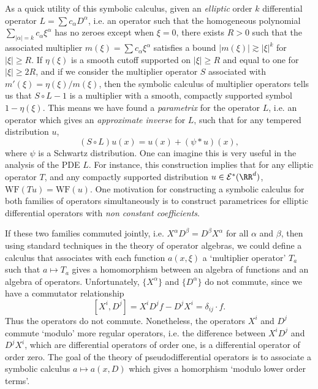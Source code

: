 As a quick utility of this symbolic calculus, given an \emph{elliptic} order $k$ differential operator $L = \sum c_\alpha D^\alpha$, i.e. an operator such that the homogeneous polynomial $\sum_{|\alpha| = k} c_\alpha \xi^\alpha$ has no zeroes except when $\xi = 0$, there exists $R > 0$ such that the associated multiplier $m(\xi) = \sum c_\alpha \xi^\alpha$ satisfies a bound $|m(\xi)| \gtrsim |\xi|^k$ for $|\xi| \geq R$. If $\eta(\xi)$ is a smooth cutoff supported on $|\xi| \geq R$ and equal to one for $|\xi| \geq 2R$, and if we consider the multiplier operator $S$ associated with $m'(\xi) = \eta(\xi) / m(\xi)$, then the symbolic calculus of multiplier operators tells us that $S \circ L - 1$ is a multiplier with a smooth, compactly supported symbol $1 - \eta(\xi)$. This means we have found a \emph{parametrix} for the operator $L$, i.e. an operator which gives an \emph{approximate inverse} for $L$, such that for any tempered distribution $u$,
%
\[ (S \circ L) u(x) = u(x) + (\psi * u)(x), \]
%
where $\psi$ is a Schwartz distribution. One can imagine this is very useful in the analysis of the PDE $L$. For instance, this construction implies that for any elliptic operator $T$, and any compactly supported distribution $u \in \mathcal{E}^*(\RR^d)$, $\text{WF}(Tu) = \text{WF}(u)$. One motivation for constructing a symbolic calculus for both families of operators simultaneously is to construct parametrices for elliptic differential operators with \emph{non constant coefficients}.

 If these two families commuted jointly, i.e. $X^\alpha D^\beta = D^\beta X^\alpha$ for all $\alpha$ and $\beta$, then using standard techniques in the theory of operator algebras, we could define a calculus that associates with each function $a(x,\xi)$ a `multiplier operator' $T_a$ such that $a \mapsto T_a$ gives a homomorphism between an algebra of functions and an algebra of operators. Unfortunately, $\{ X^\alpha \}$ and $\{ D^\alpha \}$ do not commute, since we have a commutator relationship
%
\[ [X^i, D^j] = X^i D^j f - D^j X^i = \delta_{ij} \cdot f. \]
%
Thus the operators do not commute. Nonetheless, the operators $X^i$ and $D^j$ commute `modulo' more regular operators, i.e. the difference between $X^i D^j$ and $D^j X^i$, which are differential operators of order one, is a differential operator of order zero. The goal of the theory of pseudodifferential operators is to associate a symbolic calculus $a \mapsto a(x,D)$ which gives a homorphism `modulo lower order terms'.

